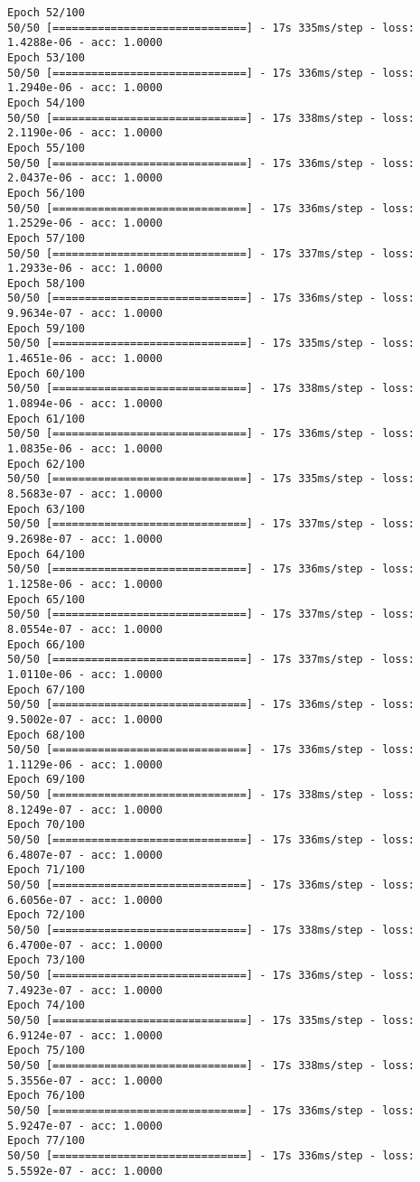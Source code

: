 \documentclass[11pt]{article}
\begin{document}
\begin{Verbatim}[commandchars=\\\{\}]
Epoch 52/100
50/50 [==============================] - 17s 335ms/step - loss: 1.4288e-06 - acc: 1.0000
Epoch 53/100
50/50 [==============================] - 17s 336ms/step - loss: 1.2940e-06 - acc: 1.0000
Epoch 54/100
50/50 [==============================] - 17s 338ms/step - loss: 2.1190e-06 - acc: 1.0000
Epoch 55/100
50/50 [==============================] - 17s 336ms/step - loss: 2.0437e-06 - acc: 1.0000
Epoch 56/100
50/50 [==============================] - 17s 336ms/step - loss: 1.2529e-06 - acc: 1.0000
Epoch 57/100
50/50 [==============================] - 17s 337ms/step - loss: 1.2933e-06 - acc: 1.0000
Epoch 58/100
50/50 [==============================] - 17s 336ms/step - loss: 9.9634e-07 - acc: 1.0000
Epoch 59/100
50/50 [==============================] - 17s 335ms/step - loss: 1.4651e-06 - acc: 1.0000
Epoch 60/100
50/50 [==============================] - 17s 338ms/step - loss: 1.0894e-06 - acc: 1.0000
Epoch 61/100
50/50 [==============================] - 17s 336ms/step - loss: 1.0835e-06 - acc: 1.0000
Epoch 62/100
50/50 [==============================] - 17s 335ms/step - loss: 8.5683e-07 - acc: 1.0000
Epoch 63/100
50/50 [==============================] - 17s 337ms/step - loss: 9.2698e-07 - acc: 1.0000
Epoch 64/100
50/50 [==============================] - 17s 336ms/step - loss: 1.1258e-06 - acc: 1.0000
Epoch 65/100
50/50 [==============================] - 17s 337ms/step - loss: 8.0554e-07 - acc: 1.0000
Epoch 66/100
50/50 [==============================] - 17s 337ms/step - loss: 1.0110e-06 - acc: 1.0000
Epoch 67/100
50/50 [==============================] - 17s 336ms/step - loss: 9.5002e-07 - acc: 1.0000
Epoch 68/100
50/50 [==============================] - 17s 336ms/step - loss: 1.1129e-06 - acc: 1.0000
Epoch 69/100
50/50 [==============================] - 17s 338ms/step - loss: 8.1249e-07 - acc: 1.0000
Epoch 70/100
50/50 [==============================] - 17s 336ms/step - loss: 6.4807e-07 - acc: 1.0000
Epoch 71/100
50/50 [==============================] - 17s 336ms/step - loss: 6.6056e-07 - acc: 1.0000
Epoch 72/100
50/50 [==============================] - 17s 338ms/step - loss: 6.4700e-07 - acc: 1.0000
Epoch 73/100
50/50 [==============================] - 17s 336ms/step - loss: 7.4923e-07 - acc: 1.0000
Epoch 74/100
50/50 [==============================] - 17s 335ms/step - loss: 6.9124e-07 - acc: 1.0000
Epoch 75/100
50/50 [==============================] - 17s 338ms/step - loss: 5.3556e-07 - acc: 1.0000
Epoch 76/100
50/50 [==============================] - 17s 336ms/step - loss: 5.9247e-07 - acc: 1.0000
Epoch 77/100
50/50 [==============================] - 17s 336ms/step - loss: 5.5592e-07 - acc: 1.0000

\end{Verbatim}
\end{document}

